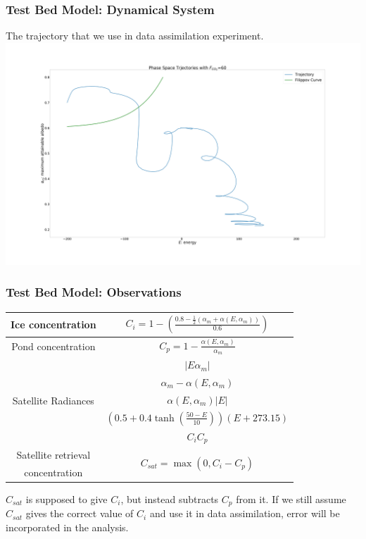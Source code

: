 \documentclass{beamer}
\begin{document}
\begin{frame}
\frametitle{Test Bed Model: Dynamical System}
The trajectory that we use in data assimilation experiment.
\centering
\includegraphics[width=\linewidth]{Figures/fc=60E=-200am=0_7.png}
\end{frame}

\begin{frame}
\frametitle{Test Bed Model: Observations}
\centering
\begin{tabular}{|c|c|}\hline
Ice concentration & $C_i=1-\left(\frac{0.8-\frac{1}{2}\left( \alpha_m+\alpha(E,\alpha_m)\right)}{0.6}\right)$\\ \hline
Pond concentration & $C_p=1-\frac{\alpha(E,\alpha_m)}{\alpha_m}$ \\ \hline
\multirow{5}{*}{Satellite Radiances} 
& $|E\alpha_m|$\\ 
& $\alpha_m-\alpha(E,\alpha_m)$\\
& $\alpha(E,\alpha_m)|E|$\\
& $(0.5+0.4\tanh(\frac{50-E}{10}))(E+273.15)$\\
& $C_i C_p$\\ \hline

Satellite retrieval & \multirow{2}{*}{$C_{sat}=\max(0,C_i-C_p)$}\\
concentration & \\ \hline
\end{tabular}
$C_{sat}$ is supposed to give $C_i$, but instead subtracts $C_p$ from it. If we still assume $C_{sat}$ gives the correct value of $C_i$ and use it in data assimilation, error will be incorporated in the analysis.
\end{frame}
\end{document}
